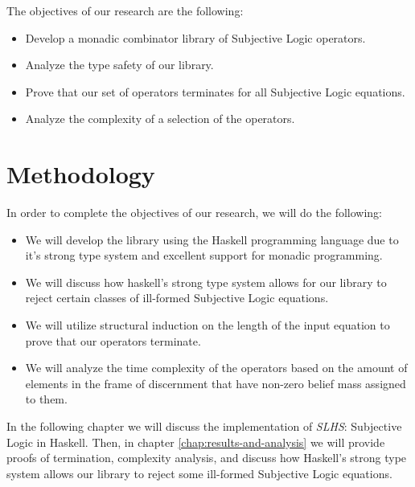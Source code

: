 \documentclass[thesis.tex]{subfiles}
\begin{document}
The objectives of our research are the following:

\begin{itemize}
  \item Develop a monadic combinator library of Subjective Logic operators.
  \item Analyze the type safety of our library.
  \item Prove that our set of operators terminates for all Subjective Logic equations.
  \item Analyze the complexity of a selection of the operators.
\end{itemize}


\section{Methodology}

In order to complete the objectives of our research, we will do the following:

\begin{itemize}
  \item We will develop the library using the Haskell programming language due to it's strong type
system and excellent support for monadic programming.
  \item We will discuss how haskell's strong type system allows for our library to reject certain
classes of ill-formed Subjective Logic equations.
  \item We will utilize structural induction on the length of the input equation to prove that
our operators terminate.
  \item We will analyze the time complexity of the operators based on the amount of elements in the
frame of discernment that have non-zero belief mass assigned to them.
\end{itemize}

In the following chapter we will discuss the implementation of \emph{SLHS}: Subjective Logic in Haskell.
Then, in chapter \ref{chap:results-and-analysis} we will provide proofs of termination, complexity
analysis, and discuss how Haskell's strong type system allows our library to reject some ill-formed
Subjective Logic equations.
\end{document}
